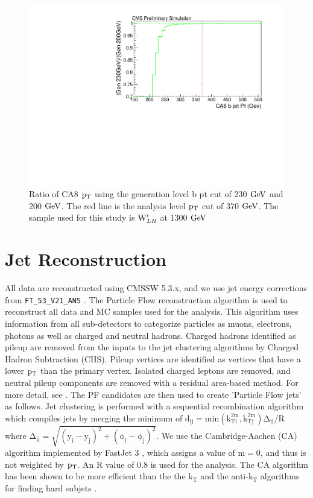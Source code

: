 \begin{figure}[Htcb]
\centering
\includegraphics[width=1.0\textwidth]{AN-13-004/figs/bjetptcut.pdf}
\caption{Ratio of CA8 $\mathrm{p_{T}}$ using the generation level b pt cut of 230$~\mathrm{GeV}$ and 200$~\mathrm{GeV}$.  The red line is the analysis level $\mathrm{p_{T}}$ cut of 370$~\mathrm{GeV}$.  The sample used for this study is $\mathrm{W}^\prime_{LR}$ at 1300$~\mathrm{GeV}$}
\label{figs:genptcut}
\end{figure}



\section{Jet Reconstruction}
\label{sec:reconstruction}
All data are reconstructed using CMSSW 5.3.x, and we use jet energy corrections from \verb!FT_53_V21_AN5! \cite{CMS-DP-2013-033}.  The Particle Flow reconstruction algorithm is used 
to reconstruct all data and MC samples used for the analysis.  This algorithm uses information from all sub-detectors 
to categorize particles as muons, electrons, photons as well as charged and 
neutral hadrons.  Charged hadrons identified as pileup are removed from the inputs to the jet clustering algorithms by Charged Hadron Subtraction (CHS).
Pileup vertices are identified as vertices that have a lower $\mathrm{p_{T}}$ than the primary vertex.  Isolated charged leptons are removed,
and neutral pileup components are removed with a residual area-based method.  For more detail, see \cite{7tevZprime}.  
The PF candidates are then used to create 'Particle Flow jets' as follows.  Jet clustering is performed 
with a sequential recombination algorithm which compiles jets by merging the minimum of 
$\mathrm{d_{ij} = min(k_{Ti}^{2m},k_{Tj}^{2m})\Delta _{ij}/R}$ where $\mathrm{\Delta _{ij} = \sqrt{(y_i-y_j)^2 + (\phi _i-\phi _j)^2}}$.
  We use the Cambridge-Aachen (CA) \cite{CAcambridge,CAaachen} algorithm implemented by FastJet 3 \cite{fastjet1,fastjet2}, 
which assigns a value of $\mathrm{m = 0}$, and thus is not weighted by $\mathrm{p_{T}}$.  An R value 
of 0.8 is used for the analysis.  The CA algorithm has been shown to be more efficient than the 
the $\mathrm{k_{T}}$ and the anti-$\mathrm{k_{T}}$ algorithms for finding hard subjets \cite{catop_cms}.

